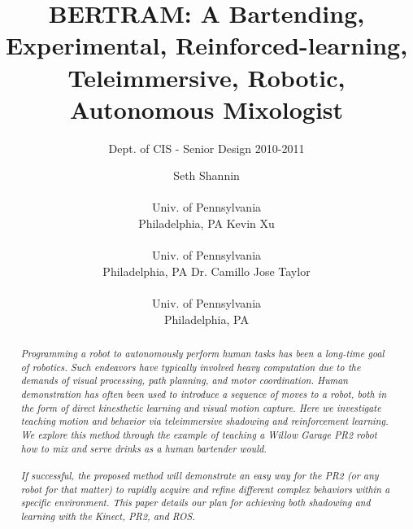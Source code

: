\documentclass{sig-alternate}
\begin{document}
 

\title{BERTRAM: A Bartending, Experimental, Reinforced-learning, Teleimmersive, Robotic, Autonomous Mixologist}

\subtitle{Dept. of CIS - Senior Design 2010-2011}
\author{
\alignauthor Seth Shannin \\  \\ Univ. of Pennsylvania \\ Philadelphia, PA
\alignauthor Kevin Xu \\  \\ Univ. of Pennsylvania \\ Philadelphia, PA
\alignauthor Dr. Camillo Jose Taylor \\  \\ Univ. of Pennsylvania \\ Philadelphia, PA}
\date{}
\maketitle

\begin{abstract}
\textit{Programming a robot to autonomously perform human tasks has been a long-time goal of robotics. Such endeavors have typically involved heavy computation due to the demands of visual processing, path planning, and motor coordination. Human demonstration has often been used to introduce a sequence of moves to a robot, both in the form of direct kinesthetic learning and visual motion capture. 
Here we investigate teaching motion and behavior via teleimmersive shadowing 
and reinforcement learning. We explore this method through the example of
teaching a Willow Garage PR2 robot how to mix and serve drinks as a human 
bartender would.
\\
\\If successful, the proposed method will demonstrate an easy way for the PR2 (or any robot for that matter) to rapidly acquire and
 refine different complex behaviors within a specific environment. This paper details our plan for achieving both shadowing and learning with the Kinect, PR2, and ROS.}
\end{abstract}

\end{document}
